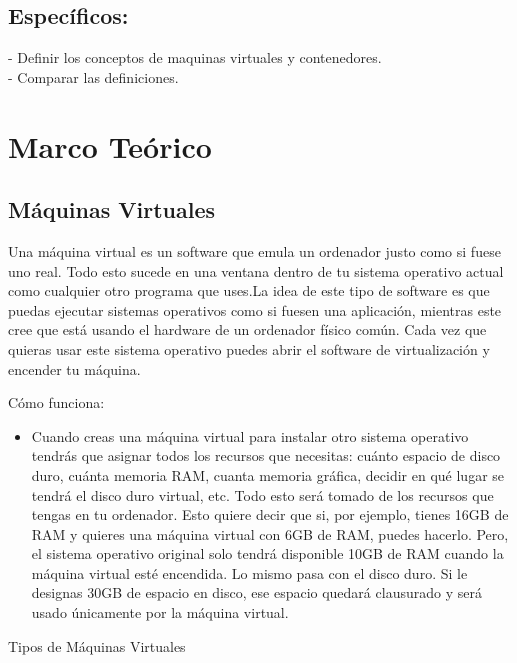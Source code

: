 \documentclass[%
 reprint,
 amsmath,amssymb,
 aps,
]{revtex4-1}
\begin{document}
\subsection{Específicos:}
-  Definir los conceptos de maquinas virtuales y contenedores.\\
- Comparar las definiciones.

\section {Marco Teórico}\label{sec:3}

\subsection{Máquinas Virtuales}
\par Una máquina virtual es un software que emula un ordenador justo como si fuese uno real. Todo esto sucede en una ventana dentro de tu sistema operativo actual como cualquier otro programa que uses.La idea de este tipo de software es que puedas ejecutar sistemas operativos como si fuesen una aplicación, mientras este cree que está usando el hardware de un ordenador físico común.
 Cada vez que quieras usar este sistema operativo puedes abrir el software de virtualización y encender tu máquina.
\par Cómo funciona:
	\begin{itemize}
		\item Cuando creas una máquina virtual para instalar otro sistema operativo tendrás que asignar todos los recursos que necesitas: cuánto espacio de disco duro, cuánta memoria RAM, cuanta memoria gráfica, decidir en qué lugar se tendrá el disco duro virtual, etc. Todo esto será tomado de los recursos que tengas en tu ordenador. Esto quiere decir que si, por ejemplo, tienes 16GB de RAM y quieres una máquina virtual con 6GB de RAM, puedes hacerlo. Pero, el sistema operativo original solo tendrá disponible 10GB de RAM cuando la máquina virtual esté encendida. Lo mismo pasa con el disco duro. Si le designas 30GB de espacio en disco, ese espacio quedará clausurado y será usado únicamente por la máquina virtual.
	\end{itemize}
\par Tipos de Máquinas Virtuales
\end{document}
